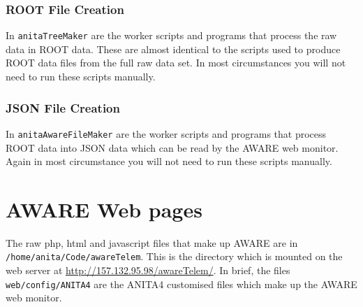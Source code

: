 \documentclass{article}
\begin{document}
\subsubsection{ROOT File Creation}
In {\tt anitaTreeMaker} are the worker scripts and programs that process the raw data in ROOT data. These are almost identical to the scripts used to produce ROOT data files from the full raw data set. In most circumstances you will not need to run these scripts manually.

\subsubsection{JSON File Creation}
In {\tt anitaAwareFileMaker} are the worker scripts and programs that process ROOT data into JSON data which can be read by the AWARE web monitor. Again in most circumstance you will not need to run these scripts manually.

\section{AWARE Web pages}
The raw php, html and javascript files that make up AWARE are in {\tt /home/anita/Code/awareTelem}. This is the directory which is mounted on the web server at \url{http://157.132.95.98/awareTelem/}. In brief, the files {\tt web/config/ANITA4} are the ANITA4 customised files which make up the AWARE web monitor.
\end{document}
